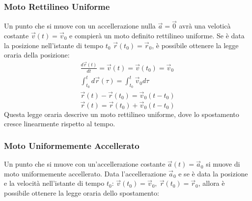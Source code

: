 \documentclass{article}
\numberwithin{equation}{subsection}
\begin{document}
\subsubsection{Moto Rettilineo Uniforme}
Un punto che si muove con un accellerazione nulla $\vec{a}=\vec{0}$ avrà 
una veloticà costante $\vec{v}(t)=\vec{v}_0$ e compierà un moto definito rettilineo uniforme. 
Se è data la posizione nell'istante di tempo $t_0$ $\vec{r}(t_0)=\vec{r}_0$, 
è possibile 
ottenere la legge oraria della posizione:
\begin{gather*}
    \displaystyle\frac{d\vec{r}(t)}{dt}=\vec{v}(t)=\vec{v}(t_0)=\vec{v}_0\\
    \displaystyle\int_{t_0}^{t}d\vec{r}(\tau)=\int_{t_0}^{t}\vec{v}_0d\tau\\
    \vec{r}(t)-\vec{r}(t_0)=\vec{v}_0(t-t_0)
\end{gather*}
\begin{equation}
    \vec{r}(t)=\vec{r}(t_0)+\vec{v}_0(t-t_0)
\end{equation}
Questa legge oraria descrive un moto rettilineo uniforme, dove 
lo spostamento cresce linearmente rispetto al tempo.

\begin{center}\end{center}

\subsubsection{Moto Uniformemente Accellerato}

Un punto che si muove con un'accellerazione costante $\vec{a}(t)=\vec{a}_0$ si muove di moto uniformemente accellerato. 
Data l'accellerazione $\vec{a}_0$ e
se è data la posizione e la velocità nell'istante di tempo 
$t_0$: $\vec{v}(t_0)=\vec{v}_0{,}\:\vec{r}(t_0)=\vec{r}_0$, 
allora è possibile ottenere la legge oraria dello spostamento:
\end{document}
